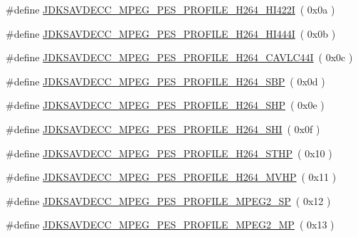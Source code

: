 \begin{DoxyCompactItemize}
\item 
\#define \hyperlink{group__mpeg__pes__profile_gae4606897833c6e58769977c8ec82da8b}{J\+D\+K\+S\+A\+V\+D\+E\+C\+C\+\_\+\+M\+P\+E\+G\+\_\+\+P\+E\+S\+\_\+\+P\+R\+O\+F\+I\+L\+E\+\_\+\+H264\+\_\+\+H\+I422I}~( 0x0a )
\item 
\#define \hyperlink{group__mpeg__pes__profile_gad36fc7d2b02bc259eac95474f7460afd}{J\+D\+K\+S\+A\+V\+D\+E\+C\+C\+\_\+\+M\+P\+E\+G\+\_\+\+P\+E\+S\+\_\+\+P\+R\+O\+F\+I\+L\+E\+\_\+\+H264\+\_\+\+H\+I444I}~( 0x0b )
\item 
\#define \hyperlink{group__mpeg__pes__profile_ga5c0d1d19c2ece156ce4159f3bcffb6a1}{J\+D\+K\+S\+A\+V\+D\+E\+C\+C\+\_\+\+M\+P\+E\+G\+\_\+\+P\+E\+S\+\_\+\+P\+R\+O\+F\+I\+L\+E\+\_\+\+H264\+\_\+\+C\+A\+V\+L\+C44I}~( 0x0c )
\item 
\#define \hyperlink{group__mpeg__pes__profile_gaecf8ef6f7e42a3a5e854f838728c339e}{J\+D\+K\+S\+A\+V\+D\+E\+C\+C\+\_\+\+M\+P\+E\+G\+\_\+\+P\+E\+S\+\_\+\+P\+R\+O\+F\+I\+L\+E\+\_\+\+H264\+\_\+\+S\+BP}~( 0x0d )
\item 
\#define \hyperlink{group__mpeg__pes__profile_ga3ccb84f0253b76b86faf53d44b101d0a}{J\+D\+K\+S\+A\+V\+D\+E\+C\+C\+\_\+\+M\+P\+E\+G\+\_\+\+P\+E\+S\+\_\+\+P\+R\+O\+F\+I\+L\+E\+\_\+\+H264\+\_\+\+S\+HP}~( 0x0e )
\item 
\#define \hyperlink{group__mpeg__pes__profile_ga1e084913cef36b0415023e3b2c016652}{J\+D\+K\+S\+A\+V\+D\+E\+C\+C\+\_\+\+M\+P\+E\+G\+\_\+\+P\+E\+S\+\_\+\+P\+R\+O\+F\+I\+L\+E\+\_\+\+H264\+\_\+\+S\+HI}~( 0x0f )
\item 
\#define \hyperlink{group__mpeg__pes__profile_gad656ba92cf7f803966928139319f0d6c}{J\+D\+K\+S\+A\+V\+D\+E\+C\+C\+\_\+\+M\+P\+E\+G\+\_\+\+P\+E\+S\+\_\+\+P\+R\+O\+F\+I\+L\+E\+\_\+\+H264\+\_\+\+S\+T\+HP}~( 0x10 )
\item 
\#define \hyperlink{group__mpeg__pes__profile_ga38c585115df471f28ee2c06d254282f9}{J\+D\+K\+S\+A\+V\+D\+E\+C\+C\+\_\+\+M\+P\+E\+G\+\_\+\+P\+E\+S\+\_\+\+P\+R\+O\+F\+I\+L\+E\+\_\+\+H264\+\_\+\+M\+V\+HP}~( 0x11 )
\item 
\#define \hyperlink{group__mpeg__pes__profile_gae429ac243ab46b3f7793a87adc991379}{J\+D\+K\+S\+A\+V\+D\+E\+C\+C\+\_\+\+M\+P\+E\+G\+\_\+\+P\+E\+S\+\_\+\+P\+R\+O\+F\+I\+L\+E\+\_\+\+M\+P\+E\+G2\+\_\+\+SP}~( 0x12 )
\item 
\#define \hyperlink{group__mpeg__pes__profile_ga8a28eaad8ffae26e9e2b964424f2bb51}{J\+D\+K\+S\+A\+V\+D\+E\+C\+C\+\_\+\+M\+P\+E\+G\+\_\+\+P\+E\+S\+\_\+\+P\+R\+O\+F\+I\+L\+E\+\_\+\+M\+P\+E\+G2\+\_\+\+MP}~( 0x13 )
\item 

\end{DoxyCompactItemize}
